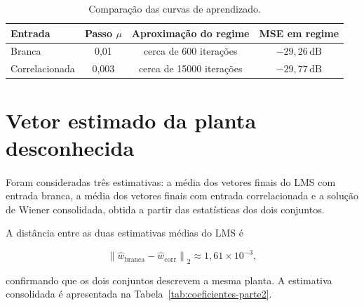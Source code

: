 \documentclass[11pt,a4paper,oneside]{report}
\begin{document}
\begin{table}[H]
    \centering
    \caption{Comparação das curvas de aprendizado.}
    \label{tab:comparacao-mse-parte2}
    \begin{tabular}{lccc}
        \toprule
        \textbf{Entrada} & \textbf{Passo \(\mu\)} & \textbf{Aproximação do regime} & \textbf{MSE em regime} \\
        \midrule
        Branca & 0,01 & cerca de 600 iterações & \(-29{,}26\,\mathrm{dB}\) \\
        Correlacionada & 0,003 & cerca de 15000 iterações & \(-29{,}77\,\mathrm{dB}\) \\
        \bottomrule
    \end{tabular}
\end{table}

\clearpage

\section{Vetor estimado da planta desconhecida}

\paragraph{} Foram consideradas três estimativas: a média dos vetores finais do LMS com entrada branca, a média dos
vetores finais com entrada correlacionada e a solução de Wiener consolidada, obtida a partir das estatísticas
dos dois conjuntos.

A distância entre as duas estimativas médias do LMS é

\begin{equation}
    \left\|
    \widehat{w}_{\mathrm{branca}}
    -\widehat{w}_{\mathrm{corr}}
    \right\|_2
    \approx1{,}61\times10^{-3},
\end{equation}

confirmando que os dois conjuntos descrevem a mesma planta. A estimativa consolidada é apresentada na
Tabela~\ref{tab:coeficientes-parte2}.
\end{document}
